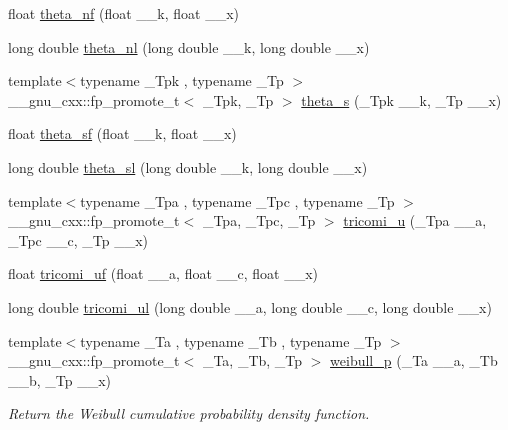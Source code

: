 \begin{DoxyCompactItemize}
\item 
float \hyperlink{group__mathsf__gnu_ga5298a95e02bd909d55e59c1f2a0b51f8}{theta\+\_\+nf} (float \+\_\+\+\_\+k, float \+\_\+\+\_\+x)
\item 
long double \hyperlink{group__mathsf__gnu_ga907f6c147387d55d2dfccbc58d1f1bc5}{theta\+\_\+nl} (long double \+\_\+\+\_\+k, long double \+\_\+\+\_\+x)
\item 
{\footnotesize template$<$typename \+\_\+\+Tpk , typename \+\_\+\+Tp $>$ }\\\+\_\+\+\_\+gnu\+\_\+cxx\+::fp\+\_\+promote\+\_\+t$<$ \+\_\+\+Tpk, \+\_\+\+Tp $>$ \hyperlink{group__mathsf__gnu_gaf28f2dca107531890b49cccf2bdd67be}{theta\+\_\+s} (\+\_\+\+Tpk \+\_\+\+\_\+k, \+\_\+\+Tp \+\_\+\+\_\+x)
\item 
float \hyperlink{group__mathsf__gnu_ga5e69cf30c9a4cc057accc43e8c4bf7a3}{theta\+\_\+sf} (float \+\_\+\+\_\+k, float \+\_\+\+\_\+x)
\item 
long double \hyperlink{group__mathsf__gnu_gac574077067a4e7b24a0a9ff2d537d885}{theta\+\_\+sl} (long double \+\_\+\+\_\+k, long double \+\_\+\+\_\+x)
\item 
{\footnotesize template$<$typename \+\_\+\+Tpa , typename \+\_\+\+Tpc , typename \+\_\+\+Tp $>$ }\\\+\_\+\+\_\+gnu\+\_\+cxx\+::fp\+\_\+promote\+\_\+t$<$ \+\_\+\+Tpa, \+\_\+\+Tpc, \+\_\+\+Tp $>$ \hyperlink{group__mathsf__gnu_gaf51a13fad85006e4d65c5b117e49f7d8}{tricomi\+\_\+u} (\+\_\+\+Tpa \+\_\+\+\_\+a, \+\_\+\+Tpc \+\_\+\+\_\+c, \+\_\+\+Tp \+\_\+\+\_\+x)
\item 
float \hyperlink{group__mathsf__gnu_gab6eb5ec587642bf0952d6c3df1c64904}{tricomi\+\_\+uf} (float \+\_\+\+\_\+a, float \+\_\+\+\_\+c, float \+\_\+\+\_\+x)
\item 
long double \hyperlink{group__mathsf__gnu_gac5213af3913aeb8beb7206688889c60c}{tricomi\+\_\+ul} (long double \+\_\+\+\_\+a, long double \+\_\+\+\_\+c, long double \+\_\+\+\_\+x)
\item 
{\footnotesize template$<$typename \+\_\+\+Ta , typename \+\_\+\+Tb , typename \+\_\+\+Tp $>$ }\\\+\_\+\+\_\+gnu\+\_\+cxx\+::fp\+\_\+promote\+\_\+t$<$ \+\_\+\+Ta, \+\_\+\+Tb, \+\_\+\+Tp $>$ \hyperlink{group__mathsf__gnu_ga9afb3065fea6ef3a91126d67f726f7af}{weibull\+\_\+p} (\+\_\+\+Ta \+\_\+\+\_\+a, \+\_\+\+Tb \+\_\+\+\_\+b, \+\_\+\+Tp \+\_\+\+\_\+x)
\begin{DoxyCompactList}\small\item\em Return the Weibull cumulative probability density function. \end{DoxyCompactList}\item 

\end{DoxyCompactItemize}
